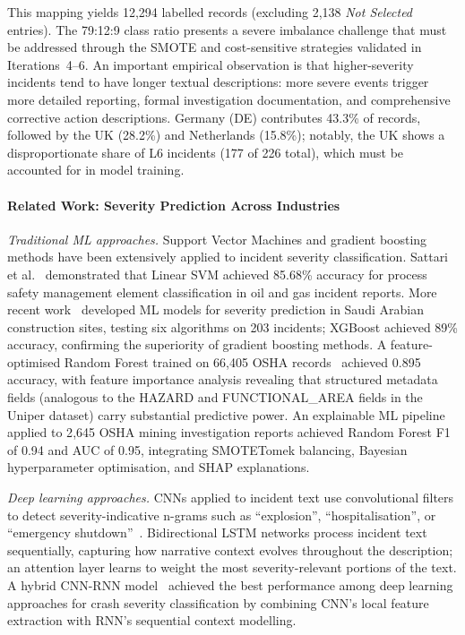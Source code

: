 \documentclass[11pt, titlepage, bibliography=totoc]{scrreprt}
\begin{document}
This mapping yields 12{,}294 labelled records (excluding 2{,}138 \textit{Not Selected} entries). The 79:12:9 class ratio presents a severe imbalance challenge that must be addressed through the SMOTE and cost-sensitive strategies validated in Iterations~4--6. An important empirical observation is that higher-severity incidents tend to have longer textual descriptions: more severe events trigger more detailed reporting, formal investigation documentation, and comprehensive corrective action descriptions. Germany (DE) contributes 43.3\% of records, followed by the UK (28.2\%) and Netherlands (15.8\%); notably, the UK shows a disproportionate share of L6 incidents (177 of 226 total), which must be accounted for in model training.

\paragraph{Related Work: Severity Prediction Across Industries}

\textit{Traditional ML approaches.}
Support Vector Machines and gradient boosting methods have been extensively applied to incident severity classification. Sattari et al.~\cite{sattari2021} demonstrated that Linear SVM achieved 85.68\% accuracy for process safety management element classification in oil and gas incident reports. More recent work~\cite{SR2025} developed ML models for severity prediction in Saudi Arabian construction sites, testing six algorithms on 203 incidents; XGBoost achieved 89\% accuracy, confirming the superiority of gradient boosting methods. A feature-optimised Random Forest trained on 66{,}405 OSHA records~\cite{PMC2022} achieved 0.895 accuracy, with feature importance analysis revealing that structured metadata fields (analogous to the HAZARD and FUNCTIONAL\_AREA fields in the Uniper dataset) carry substantial predictive power. An explainable ML pipeline~\cite{SD2025} applied to 2{,}645 OSHA mining investigation reports achieved Random Forest F1 of 0.94 and AUC of 0.95, integrating SMOTETomek balancing, Bayesian hyperparameter optimisation, and SHAP explanations.

\textit{Deep learning approaches.}
CNNs applied to incident text use convolutional filters to detect severity-indicative n-grams such as ``explosion'', ``hospitalisation'', or ``emergency shutdown''~\cite{wang2025bert}. Bidirectional LSTM networks process incident text sequentially, capturing how narrative context evolves throughout the description; an attention layer learns to weight the most severity-relevant portions of the text. A hybrid CNN-RNN model~\cite{ArXiv2024} achieved the best performance among deep learning approaches for crash severity classification by combining CNN's local feature extraction with RNN's sequential context modelling.
\end{document}
